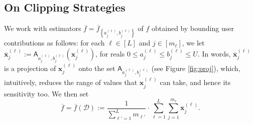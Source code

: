 \documentclass[conference,letterpaper]{IEEEtran}
\theoremstyle{remark}
\theoremstyle{definition}
\begin{document}
\subsection{On Clipping Strategies}
We work with estimators $\overline{f} = \overline{f}_{\left\{a_j^{(\ell)},b_j^{(\ell)}\right\}}$ of $f$ obtained by bounding user contributions as follows: for each $\ell\in [L]$ and $j\in [m_\ell]$, we let $\overline{\mathbf{x}}_j^{(\ell)}:= {\mathsf{A}_{a_j^{(\ell)},b_j^{(\ell)}}}\left(\mathbf{x}_j^{(\ell)}\right)$, for reals $0\leq a_j^{(\ell)}\leq b_j^{(\ell)}\leq U$. In words, $\overline{\mathbf{x}}_j^{(\ell)}$ is a projection of $\mathbf{x}_j^{(\ell)}$ onto the set $\mathsf{A}_{a_j^{(\ell)},b_j^{(\ell)}}$ (see Figure \ref{fig:proj}), which, intuitively, reduces the range of values that $\mathbf{x}_j^{(\ell)}$ can take, and hence its sensitivity too. We then set 
\[
\overline{f} = \overline{f}(\mathcal{D}):= \frac{1}{\sum_{\ell'=1}^L m_{\ell'}}\cdot \sum_{\ell=1}^L \sum_{j=1}^{m_\ell} \mathbf{\overline{x}}_j^{(\ell)}.
\]
\end{document}
